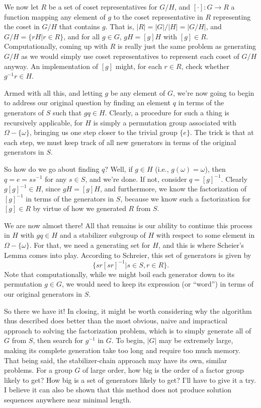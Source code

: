 \documentclass[12pt]{article}
\begin{document}
We now let $R$ be a set of coset representatives for $G/H$, and $[\cdot]:G\to R$ a function
mapping any element of $g$ to the coset representative in $R$ representing the coset in $G/H$ that contains $g$.
That is, $|R|=|G|/|H|=|G/H|$, and $G/H=\{rH|r\in R\}$, and for all $g\in G$, $gH=[g]H$ with $[g]\in R$.
Computationally, coming up with $R$ is really just the same problem as generating $G/H$ as we would simply use
coset representatives to represent each coset of $G/H$ anyway.  An implementation of $[g]$ might,
for each $r\in R$, check whether $g^{-1}r\in H$.

Armed with all this, and letting $g$ be any element of $G$, we're now going to begin to address our original
question by finding an element $q$ in terms of the generators of $S$ such that $gq\in H$.  Clearly, a procedure
for such a thing is recursively applicable, for $H$ is simply a permutation group associated with $\Omega-\{\omega\}$,
bringing us one step closer to the trivial group $\{e\}$.  The trick is that at each step, we must keep track of all new
generators in terms of the original generators in $S$.

So how do we go about finding $q$?  Well, if $g\in H$ (i.e., $g(\omega)=\omega$), then $q=e=ss^{-1}$ for any $s\in S$,
and we're done.  If not, consider $q=[g]^{-1}$.  Clearly $g[g]^{-1}\in H$, since $gH=[g]H$, and furthermore,
we know the factorization of $[g]^{-1}$ in terms of the generators in $S$, because we know such a factorization
for $[g]\in R$ by virtue of how we generated $R$ from $S$.

We are now almost there!  All that remains is our ability to continue this process in $H$ with $gq\in H$ and a stabilizer
subgroup of $H$ with respect to some element in $\Omega-\{\omega\}$.  For that, we need a generating set for $H$,
and this is where Scheier's Lemma comes into play.  According to Schreier, this set of generators is given by
\begin{equation*}
\{sr[sr]^{-1}|s\in S, r\in R\}.
\end{equation*}
Note that computationally, while we might boil each generator down to its permutation $g\in G$, we would need
to keep its expression (or ``word'') in terms of our original generators in $S$.

So there we have it!  In closing, it might be worth considering why the algorithm thus described does
better than the most obvious, naive and impractical approach to solving the factorization problem, which is to
simply generate all of $G$ from $S$, then search for $g^{-1}$ in $G$.  To begin, $|G|$ may be
extremely large, making its complete generation take too long and require too much memory.
That being said, the stabilizer-chain approach may have its own, similar problems.  For a group $G$
of large order, how big is the order of a factor group likely to get?  How big is a set of generators
likely to get?  I'll have to give it a try.  I believe it can also be shown that this method does not
produce solution sequences anywhere near minimal length.
\end{document}
